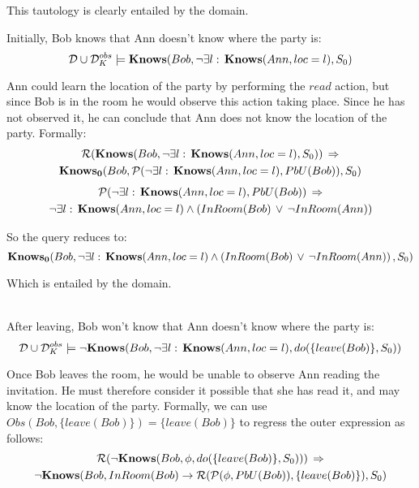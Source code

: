 This tautology is clearly entailed by the domain.\\


\begin{example}
Initially, Bob knows that Ann doesn't know where the party is:\[
\mathcal{D}\cup\mathcal{D}_{K}^{obs}\models\mathbf{Knows}(Bob,\neg\exists l:\,\mathbf{Knows}(Ann,loc=l),S_{0})\]

\end{example}
Ann could learn the location of the party by performing the $read$
action, but since Bob is in the room he would observe this action
taking place. Since he has not observed it, he can conclude that Ann
does not know the location of the party. Formally:\begin{multline*}
\mathcal{R}(\mathbf{Knows}(Bob,\neg\exists l:\,\mathbf{Knows}(Ann,loc=l),S_{0}))\,\Rightarrow\\
\mathbf{Knows_{0}}(Bob,\mathcal{P}(\neg\exists l:\,\mathbf{Knows}(Ann,loc=l),PbU(Bob)),S_{0})\end{multline*}
 \begin{multline*}
\mathcal{P}(\neg\exists l:\,\mathbf{Knows}(Ann,loc=l),PbU(Bob))\,\Rightarrow\\
\neg\exists l:\,\mathbf{Knows}(Ann,loc=l)\wedge\left(InRoom(Bob)\,\vee\,\neg InRoom(Ann)\right)\end{multline*}


So the query reduces to:\[
\mathbf{Knows_{0}}(Bob,\neg\exists l:\,\mathbf{Knows}(Ann,loc=l)\wedge\left(InRoom(Bob)\,\vee\,\neg InRoom(Ann)\right),S_{0})\]


Which is entailed by the domain.\\
 \\


\begin{example}
After leaving, Bob won't know that Ann doesn't know where the party
is:\[
\mathcal{D}\cup\mathcal{D}_{K}^{obs}\models\mathbf{\neg Knows}(Bob,\neg\exists l:\,\mathbf{Knows}(Ann,loc=l),do(\{leave(Bob)\},S_{0}))\]

\end{example}
Once Bob leaves the room, he would be unable to observe Ann reading
the invitation. He must therefore consider it possible that she has
read it, and may know the location of the party. Formally, we can
use $Obs(Bob,\{leave(Bob)\})=\{leave(Bob)\}$ to regress the outer
expression as follows:\begin{multline*}
\mathcal{R}(\neg\mathbf{Knows}(Bob,\phi,do(\{leave(Bob)\},S_{0})))\,\Rightarrow\\
\neg\mathbf{Knows}(Bob,InRoom(Bob)\rightarrow\mathcal{R}(\mathcal{P}(\phi,PbU(Bob)),\{leave(Bob)\}),S_{0})\end{multline*}


